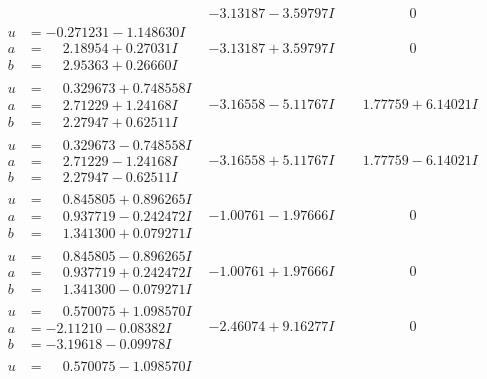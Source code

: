 \documentclass[1p]{elsarticle_modified}
\theoremstyle{definition}
\begin{document}
$$\begin{array}{c|c|c}
 & -3.13187 - 3.59797 I & \phantom{-0.000000 } 0 \\ \hline\begin{aligned}
u &= -0.271231 - 1.148630 I \\
a &= \phantom{-}2.18954 + 0.27031 I \\
b &= \phantom{-}2.95363 + 0.26660 I\end{aligned}
 & -3.13187 + 3.59797 I & \phantom{-0.000000 } 0 \\ \hline\begin{aligned}
u &= \phantom{-}0.329673 + 0.748558 I \\
a &= \phantom{-}2.71229 + 1.24168 I \\
b &= \phantom{-}2.27947 + 0.62511 I\end{aligned}
 & -3.16558 - 5.11767 I & \phantom{-}1.77759 + 6.14021 I \\ \hline\begin{aligned}
u &= \phantom{-}0.329673 - 0.748558 I \\
a &= \phantom{-}2.71229 - 1.24168 I \\
b &= \phantom{-}2.27947 - 0.62511 I\end{aligned}
 & -3.16558 + 5.11767 I & \phantom{-}1.77759 - 6.14021 I \\ \hline\begin{aligned}
u &= \phantom{-}0.845805 + 0.896265 I \\
a &= \phantom{-}0.937719 - 0.242472 I \\
b &= \phantom{-}1.341300 + 0.079271 I\end{aligned}
 & -1.00761 - 1.97666 I & \phantom{-0.000000 } 0 \\ \hline\begin{aligned}
u &= \phantom{-}0.845805 - 0.896265 I \\
a &= \phantom{-}0.937719 + 0.242472 I \\
b &= \phantom{-}1.341300 - 0.079271 I\end{aligned}
 & -1.00761 + 1.97666 I & \phantom{-0.000000 } 0 \\ \hline\begin{aligned}
u &= \phantom{-}0.570075 + 1.098570 I \\
a &= -2.11210 - 0.08382 I \\
b &= -3.19618 - 0.09978 I\end{aligned}
 & -2.46074 + 9.16277 I & \phantom{-0.000000 } 0 \\ \hline\begin{aligned}
u &= \phantom{-}0.570075 - 1.098570 I \\

\end{aligned}
\end{array}$$
\end{document}
